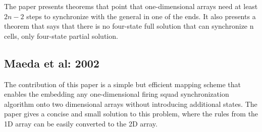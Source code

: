 \documentclass{article}
\begin{document}
The paper presents theorems that point that one-dimensional arrays need at least $2n - 2$ steps to synchronize with the general in one of the ends. It also presents a theorem that says that there is no four-state full solution that can synchronize n cells, only four-state partial solution.





\subsection{Maeda et al: 2002}

The contribution of this paper \cite{maeda2002efficient} is a simple but efficient mapping scheme that enables the
embedding any one-dimensional firing squad synchronization algorithm onto two dimensional arrays without introducing additional states. The paper gives a concise and small solution to this problem, where the rules from the 1D array can be easily converted to the 2D array.
\end{document}
